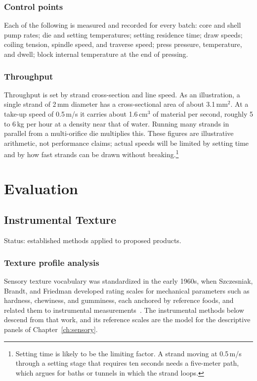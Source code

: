 \documentclass[11pt,openany]{book}
\theoremstyle{definition}
\begin{document}
\section{Control points}

Each of the following is measured and recorded for every batch: core and shell pump rates; die and setting temperatures; setting residence time; draw speeds; coiling tension, spindle speed, and traverse speed; press pressure, temperature, and dwell; block internal temperature at the end of pressing.

\section{Throughput}

Throughput is set by strand cross-section and line speed. As an illustration, a single strand of 2\,mm diameter has a cross-sectional area of about 3.1\,mm$^2$. At a take-up speed of 0.5\,m/s it carries about 1.6\,cm$^3$ of material per second, roughly 5 to 6\,kg per hour at a density near that of water. Running many strands in parallel from a multi-orifice die multiplies this. These figures are illustrative arithmetic, not performance claims; actual speeds will be limited by setting time and by how fast strands can be drawn without breaking.\footnote{Setting time is likely to be the limiting factor. A strand moving at 0.5\,m/s through a setting stage that requires ten seconds needs a five-meter path, which argues for baths or tunnels in which the strand loops.}

\part{Evaluation}

\chapter{Instrumental Texture}\label{ch:texture}

Status: established methods applied to proposed products.

\section{Texture profile analysis}

Sensory texture vocabulary was standardized in the early 1960s, when Szczesniak, Brandt, and Friedman developed rating scales for mechanical parameters such as hardness, chewiness, and gumminess, each anchored by reference foods, and related them to instrumental measurements~\cite{szczesniak1963}. The instrumental methods below descend from that work, and its reference scales are the model for the descriptive panels of Chapter~\ref{ch:sensory}.
\end{document}
